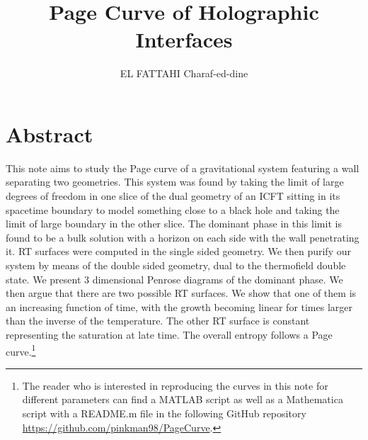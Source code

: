 \documentclass{easyclass}
\begin{document}
\begin{titlepage}
    \title{Page Curve of Holographic Interfaces}
    \author{EL FATTAHI Charaf-ed-dine}
    \maketitle
\end{titlepage}

\chapter*{Abstract}
    This note aims to study the Page curve of a gravitational system featuring a wall separating two geometries. This system was found by taking the limit of large degrees of freedom in one slice of the dual geometry of an ICFT sitting in its spacetime boundary to model something close to a black hole and taking the limit of large boundary in the other slice. The dominant phase in this limit is found to be a bulk solution with a horizon on each side with the wall penetrating it. RT surfaces were computed in the single sided geometry. We then purify our system by means of the double sided geometry, dual to the thermofield double state. We present 3 dimensional Penrose diagrams of the dominant phase. We then argue that there are two possible RT surfaces. We show that one of them is an increasing function of time, with the growth becoming linear for times larger than the inverse of the temperature. The other RT surface is constant representing the saturation at late time. The overall entropy follows a Page curve.\footnote{The reader who is interested in reproducing the curves in this note for different parameters can find a MATLAB script as well as a Mathematica script with a README.m file in the following GitHub repository \url{https://github.com/pinkman98/PageCurve}.}


\tableofcontents

\setcounter{chapter}{0}
\label{section 1}


\setcounter{chapter}{1}
\label{section 2}


\setcounter{chapter}{2}
\label{section 3}

\end{document}
